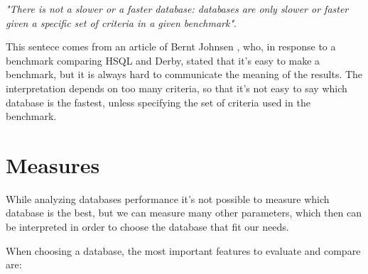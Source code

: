 \label{axiom} \emph{"There is not a slower or a faster database: databases are only slower or faster given a specific set of criteria in a given benchmark"}.

This sentece comes from an article of Bernt Johnsen \cite{Bernt}, who, in response to a benchmark comparing HSQL and Derby, stated that it's easy to make a benchmark, but it is always hard to communicate the meaning of the results. The interpretation depends on too many criteria, so that it's not easy to say which database is the fastest, unless specifying the set of criteria used in the benchmark.
	
		\section{Measures}
While analyzing databases performance it's not possible to measure which database is the best, but we can measure many other parameters, which then can be interpreted in order to choose the database that fit our needs.

When choosing a database, the most important features to evaluate and compare are:

